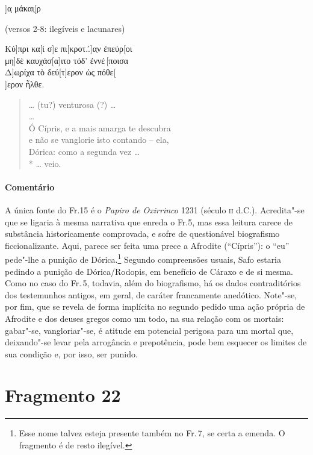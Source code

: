 \begin{gkverse}
]α̣ μάκαι̣[ρ

\textnormal{(versos 2-8: ilegíveis e lacunares)}

Κύ]πρι κα[ί σ]ε πι[κροτ..́]α̣ν ἐπεύρ[οι\\
μη]δὲ καυχάσ[α]ιτο τόδ’ ἐννέ\,[ποισα\\
Δ]ω̣ρίχα τὸ δεύ[τ]ερον ὠς πόθε[\\
]ερον ἦλθε.

\end{gkverse}

\begin{verse}
\ldots{} (tu?) venturosa (?) \ldots{}\\ 
\ldots{}\\
Ó Cípris, e a mais amarga te descubra\\
e não se vanglorie isto contando -- ela,\\
Dórica: como a segunda vez \ldots{}\\*
\ldots{} veio.
\end{verse}

{\paragraph{Comentário} A única fonte do Fr.15 é o \textit{Papiro de Oxirrinco} 1231 (século \textsc{ii} d.C.).
Acredita"-se que se ligaria à mesma narrativa que enreda o Fr.5, mas essa
leitura carece de substância historicamente comprovada, e sofre de
questionável biografismo ficcionalizante. Aqui,
parece ser feita uma prece a Afrodite (“Cípris”): o “eu” pede"-lhe a
punição de Dórica.\footnote{Esse nome talvez esteja presente também no Fr.\,7, se certa a emenda. O fragmento é de resto ilegível.} Segundo compreensões usuais, Safo estaria pedindo a punição
de Dórica/Rodopis, em benefício de Cáraxo e de si mesma. Como no caso do Fr.\,5,
todavia, além do biografismo, há os dados contraditórios dos testemunhos
antigos, em geral, de caráter francamente anedótico. Note"-se, por fim, que se
revela de forma implícita no segundo pedido uma ação própria de Afrodite e dos
deuses gregos como um todo, na sua relação com os mortais: gabar"-se,
vangloriar"-se, é atitude em potencial perigosa para um mortal que,
deixando"-se levar pela arrogância e prepotência, pode bem esquecer
os limites de sua condição e, por isso, ser punido.}

\pagebreak


\section{Fragmento 22}

